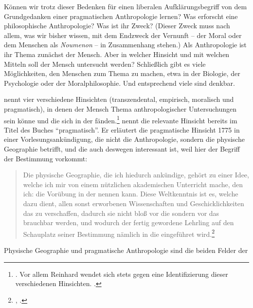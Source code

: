 Können wir trotz dieser Bedenken für einen liberalen Aufklärungsbegriff von dem
Grundgedanken einer pragmatischen Anthropologie lernen? Was erforscht eine
philosophische Anthropologie? Was ist ihr Zweck? (Dieser Zweck muss nach allem,
was wir bisher wissen, mit dem Endzweck der Vernunft -- der Moral oder dem
Menschen als \emph{Noumenon} -- in Zusammenhang stehen.) Als Anthropologie ist
ihr Thema zunächst der Mensch.
Aber in welcher Hinsicht und mit welchen Mitteln soll der Mensch untersucht
werden? Schließlich gibt es viele Möglichkeiten, den Menschen zum Thema zu
machen, etwa in der Biologie, der Psychologie oder der Moralphilosophie. Und
entsprechend viele  sind denkbar.


nennt vier verschiedene Hinsichten (transzendental, empirisch, moralisch und
pragmatisch), in denen der Mensch Thema anthropologischer Untersuchungen sein
könne und die sich in der 
fänden.\footnote{\cite[Vgl.][]{Schmidt:KantsTranscendentalEmpiricalPragmaticandMoralAnthropology2007}.
Vor allem Reinhard  wendet sich stets gegen eine
Identifizierung dieser verschiedenen Hinsichten. \cite[Vgl.
z.\,B.][92]{Brandt:KritischerKommentarzuKantsenquoteAnthropologieinpragmatischerHinsicht1999}.}
 nennt die relevante Hinsicht bereits im Titel des Buches \enquote{pragmatisch}. Er erläutert die
pragmatische Hinsicht 1775 in einer Vorlesungsankündigung, die nicht die Anthropologie, sondern die
physische Geographie betrifft, und die auch deswegen interessant ist, weil hier
der Begriff der Bestimmung vorkommt:
\begin{quote}
  Die physische Geographie, die ich hiedurch ankündige, gehört zu einer Idee,
  welche ich mir von einem nützlichen akademischen Unterricht mache, den ich:
  die Vorübung in der  nennen kann. Diese Weltkenntnis
  ist es, welche dazu dient, allen sonst erworbenen Wissenschaften und
  Geschicklichkeiten das  zu verschaffen, dadurch sie nicht
  bloß vor die  sondern vor das  brauchbar werden, und
  wodurch der fertig gewordene Lehrling auf den Schauplatz seiner Bestimmung
  nämlich in die  eingeführet
  wird.\footnote{\cite[A~12]{Kant:VondenverschiedenenRassenderMenschen1977},
  \cite[II: 443.12--19]{Kant:GesammelteWerke1900ff.}.}
\end{quote}
Physische Geographie und pragmatische Anthropologie sind die beiden Felder der
